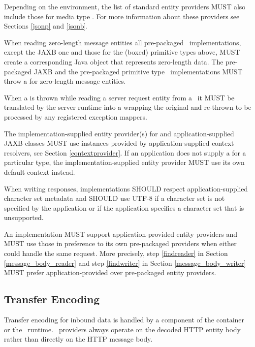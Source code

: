 Depending on the environment, the list of standard entity providers MUST also include those for media type . For more information about these providers see Sections \ref{jsonp} and \ref{jsonb}.

When reading zero-length message entities all pre-packaged \MsgRead\ implementations, except the JAXB one and those for the (boxed) primitive types above, MUST create a corresponding Java object that represents zero-length data. The pre-packaged JAXB and the pre-packaged primitive type \MsgRead\ implementations MUST throw a  for zero-length message entities. 

When a  is thrown while reading a server request entity from a \MsgRead\, it MUST be translated by the server runtime into a  wrapping the original  and re-thrown to be processed by any registered exception mappers.

The implementation-supplied entity provider(s) for  and application-supplied JAXB classes MUST use  instances provided by application-supplied context resolvers, see Section \ref{contextprovider}. If an application does not supply a  for a particular type, the implementation-supplied entity provider MUST use its own default context instead.

When writing responses, implementations SHOULD respect application-supplied character set metadata and SHOULD use UTF-8 if a character set is not specified by the application or if the application specifies a character set that is unsupported.

An implementation MUST support application-provided entity providers and MUST use those in preference to its own pre-packaged providers when either could handle the same request. More precisely, step \ref{findreader} in Section \ref{message_body_reader} and step \ref{findwriter} in Section \ref{message_body_writer} MUST prefer application-provided over pre-packaged entity providers.

\subsection{Transfer Encoding}
\label{transfer_encoding}

Transfer encoding for inbound data is handled by a component of the container or the \jaxrs\ runtime. \MsgRead\ providers always operate on the decoded HTTP entity body rather than directly on the HTTP message body.

